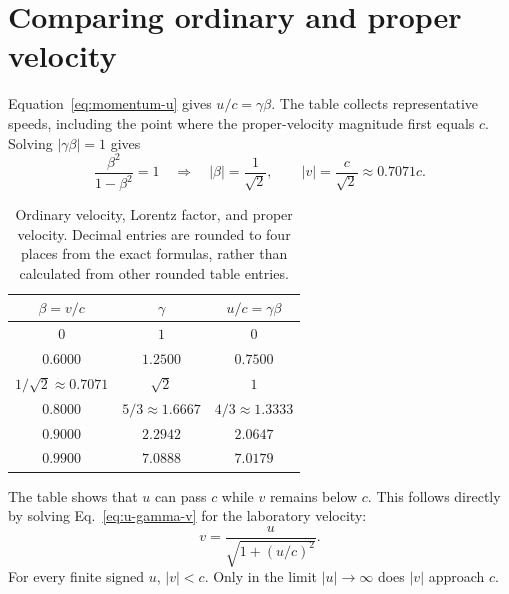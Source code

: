 \documentclass[12pt]{article}
\begin{document}
\section{Comparing ordinary and proper velocity}
\label{sec:comparison}

Equation~\eqref{eq:momentum-u} gives $u/c=\gamma\beta$. The table collects representative speeds, including the point where the proper-velocity magnitude first equals $c$. Solving $|\gamma\beta|=1$ gives
\begin{equation}
  \frac{\beta^2}{1-\beta^2}=1
  \quad\Longrightarrow\quad
  |\beta|=\frac{1}{\sqrt2},
  \qquad |v|=\frac{c}{\sqrt2}\approx0.7071c.
  \label{eq:threshold}
\end{equation}
\begin{table}[ht]
  \centering
  \small
  \begin{tabular}{@{}ccc@{}}
    \toprule
    $\beta=v/c$ & $\gamma$ & $u/c=\gamma\beta$ \\
    \midrule
    $0$ & $1$ & $0$ \\
    $0.6000$ & $1.2500$ & $0.7500$ \\
    $1/\sqrt2\approx0.7071$ & $\sqrt2$ & $1$ \\
    $0.8000$ & $5/3\approx1.6667$ & $4/3\approx1.3333$ \\
    $0.9000$ & $2.2942$ & $2.0647$ \\
    $0.9900$ & $7.0888$ & $7.0179$ \\
    \bottomrule
  \end{tabular}
  \caption{Ordinary velocity, Lorentz factor, and proper velocity. Decimal entries are rounded to four places from the exact formulas, rather than calculated from other rounded table entries.}
  \label{tab:velocity-comparison}
\end{table}

The table shows that $u$ can pass $c$ while $v$ remains below $c$. This follows directly by solving Eq.~\eqref{eq:u-gamma-v} for the laboratory velocity:
\begin{equation}
  v=\frac{u}{\sqrt{1+(u/c)^2}}.
  \label{eq:v-from-u}
\end{equation}
For every finite signed $u$, $|v|<c$. Only in the limit $|u|\to\infty$ does $|v|$ approach $c$.
\end{document}
